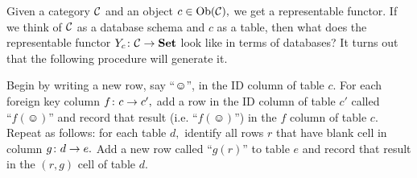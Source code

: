 \documentclass[CT4S-EN-RU]{subfiles}
\begin{document}
\begin{definitionRUS}\label{def:representable functor}
\end{definitionRUS}

\begin{exampleENG}
Given a category $\mathcal{C}$ and an object $c\in\operatorname{Ob}(\mathcal{C}),$ we get a representable functor. If we think of $\mathcal{C}$ as a database schema and $c$ as a table, then what does the representable functor $Y_c\colon\mathcal{C}\rightarrow{\mathbf{Set}}$ look like in terms of databases? It turns out that the following procedure will generate it. 

Begin by writing a new row, say “$\smiley$”, in the ID column of table $c.$ For each foreign key column $f\colon c\rightarrow c',$ add a row in the ID column of table $c'$ called $“f(\smiley)”$ and record that result (i.e. “$f(\smiley)$”) in the $f$ column of table $c.$ Repeat as follows: for each table $d,$ identify all rows $r$ that have blank cell in column $g\colon d\rightarrow e.$ Add a new row called $“g(r)”$ to table $e$ and record that result in the $(r,g)$ cell of table $d.$


\end{exampleENG}
\end{document}
